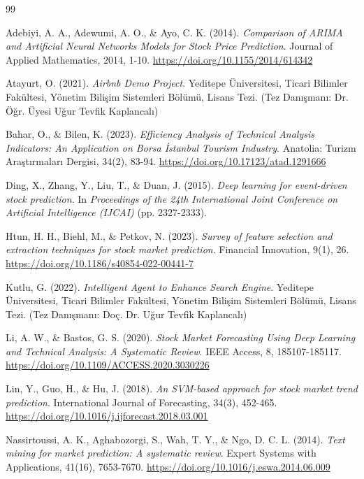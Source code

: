\documentclass[12pt,a4paper]{report}
\begin{document}
\begin{thebibliography}{99}

Adebiyi, A. A., Adewumi, A. O., \& Ayo, C. K. (2014). \emph{Comparison of ARIMA and Artificial Neural Networks Models for Stock Price Prediction}. Journal of Applied Mathematics, 2014, 1-10. \url{https://doi.org/10.1155/2014/614342}

Atayurt, O. (2021). \emph{Airbnb Demo Project}. Yeditepe Üniversitesi, Ticari Bilimler Fakültesi, Yönetim Bilişim Sistemleri Bölümü, Lisans Tezi. (Tez Danışmanı: Dr. Öğr. Üyesi Uğur Tevfik Kaplancalı)

Bahar, O., \& Bilen, K. (2023). \emph{Efficiency Analysis of Technical Analysis Indicators: An Application on Borsa İstanbul Tourism Industry}. Anatolia: Turizm Araştırmaları Dergisi, 34(2), 83-94. \url{https://doi.org/10.17123/atad.1291666}

Ding, X., Zhang, Y., Liu, T., \& Duan, J. (2015). \emph{Deep learning for event-driven stock prediction}. In \emph{Proceedings of the 24th International Joint Conference on Artificial Intelligence (IJCAI)} (pp. 2327-2333).

Htun, H. H., Biehl, M., \& Petkov, N. (2023). \emph{Survey of feature selection and extraction techniques for stock market prediction}. Financial Innovation, 9(1), 26. \url{https://doi.org/10.1186/s40854-022-00441-7}

Kutlu, G. (2022). \emph{Intelligent Agent to Enhance Search Engine}. Yeditepe Üniversitesi, Ticari Bilimler Fakültesi, Yönetim Bilişim Sistemleri Bölümü, Lisans Tezi. (Tez Danışmanı: Doç. Dr. Uğur Tevfik Kaplancalı)

Li, A. W., \& Bastos, G. S. (2020). \emph{Stock Market Forecasting Using Deep Learning and Technical Analysis: A Systematic Review}. IEEE Access, 8, 185107-185117. \url{https://doi.org/10.1109/ACCESS.2020.3030226}

Lin, Y., Guo, H., \& Hu, J. (2018). \emph{An SVM-based approach for stock market trend prediction}. International Journal of Forecasting, 34(3), 452-465. \url{https://doi.org/10.1016/j.ijforecast.2018.03.001}

Nassirtoussi, A. K., Aghabozorgi, S., Wah, T. Y., \& Ngo, D. C. L. (2014). \emph{Text mining for market prediction: A systematic review}. Expert Systems with Applications, 41(16), 7653-7670. \url{https://doi.org/10.1016/j.eswa.2014.06.009}


\end{thebibliography}
\end{document}
